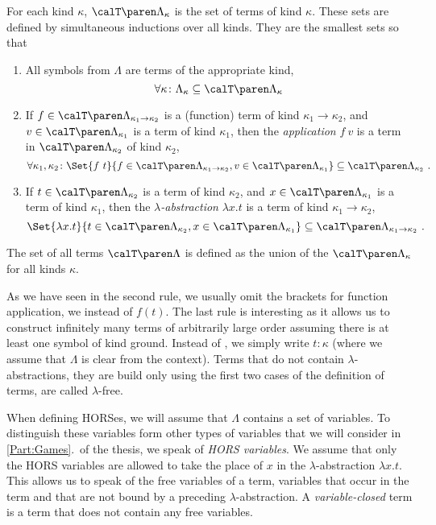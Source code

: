 \documentclass[../../diss.tex]{subfiles}
\begin{document}
For each kind $\kappa$, $\horsterms{\Lambda}{\kappa}$ is the set of terms of kind $\kappa$.
These sets are defined by simultaneous inductions over all kinds.
They are the smallest sets so that
\begin{enumerate}[(1)]
    \item
        All symbols from $\Lambda$ are terms of the appropriate kind,
        \[
            \forall \kappa \colon
            \Lambda_\kappa \subseteq \horsterms{\Lambda}{\kappa}
        \]
    \item
        If $f  \in \horsterms{\Lambda}{\kappa_1 \to \kappa_2}$ is a (function) term of kind $\kappa_1 \to \kappa_2$, and $v \in \horsterms{\Lambda}{\kappa_1}$ is a term of kind $\kappa_1$, then the \emph{application} $f\ v$ is a term in $\horsterms{\Lambda}{\kappa_2}$ of kind $\kappa_2$,
        \[
            \forall \kappa_1, \kappa_2 \colon
            \Set{f \appl t}{f \in \horsterms{\Lambda}{\kappa_1 \to \kappa_2},  v \in \horsterms{\Lambda}{\kappa_1}} \subseteq \horsterms{\Lambda}{\kappa_2}
            \ .
        \]
    \item
        If $t \in \horsterms{\Lambda}{\kappa_2}$ is a term of kind $\kappa_2$, and $x \in \horsterms{\Lambda}{\kappa_1}$ is a term of kind $\kappa_1$, then the \emph{$\lambda$-abstraction} $\lambda x . t$ is a term of kind $\kappa_1 \to \kappa_2$,
        \[
            \Set{ \lambda x . t}{ t \in \horsterms{\Lambda}{\kappa_2},  x \in \horsterms{\Lambda}{\kappa_1} }
            \subseteq
            \horsterms{\Lambda}{\kappa_1 \to \kappa_2}
            \ .
        \]
\end{enumerate}
The set of all terms $\horsterms{\Lambda}$ is defined as the union of the $\horsterms{\Lambda}{\kappa}$ for all kinds $\kappa$.

As we have seen in the second rule, we usually omit the brackets for function application, \ie we  instead of $f(t)$.
The last rule is interesting as it allows us to construct infinitely many terms of arbitrarily large order assuming there is at least one symbol of kind ground.
Instead of , we simply write $t \colon \kappa$ (where we assume that $\Lambda$ is clear from the context).
%
Terms that do not contain $\lambda$-abstractions, \ie they are build only using the first two cases of the definition of terms, are called $\lambda$-free.

When defining HORSes, we will assume that $\Lambda$ contains a set of variables.
To distinguish these variables form other types of variables that we will consider in \cref{Part:Games}.~of the thesis, we speak of \emph{HORS variables}.
We assume that only the HORS variables are allowed to take the place of $x$ in the $\lambda$-abstraction $\lambda x . t$.
This allows us to speak of the free variables of a term, \ie variables that occur in the term and that are not bound by a preceding $\lambda$-abstraction.
A \emph{variable-closed} term is a term that does not contain any free variables.
\end{document}
